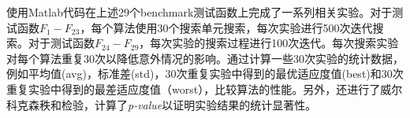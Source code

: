 使用Matlab代码在上述29个benchmark测试函数上完成了一系列相关实验。对于测试函数$F_1-F_{23}$，每个算法使用30个搜索单元搜索，每次实验进行500次迭代搜索。对于测试函数$F_{24}-F_{29}$，每次实验的搜索过程进行100次迭代。每次搜索实验对每个算法重复30次以降低意外情况的影响。通过计算一些30次实验的统计数据，例如平均值(avg)，标准差(std)，30次重复实验中得到的最优适应度值(best)和30次重复实验中得到的最差适应度值（worst），比较算法的性能。另外，还进行了威尔科克森秩和检验，计算了\emph{p-value}以证明实验结果的统计显著性。

